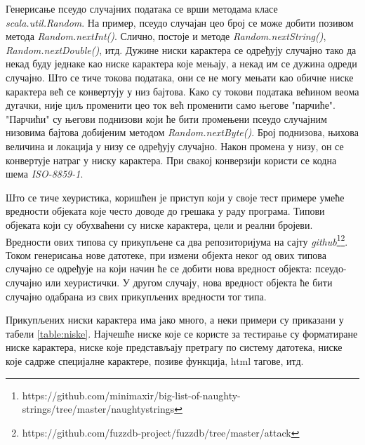 \documentclass[12pt,oneside]{memoir}
\begin{document}
Генерисање псеудо случајних података се врши методама класе \textit{scala.util.Random}. На пример, псеудо случајан цео број се може добити позивом метода \textit{Random.nextInt()}. Слично, постоје и методе \textit{Random.nextString()}, \textit{Random.nextDouble()}, итд. Дужине ниски карактера се одређују случајно тако да некад буду једнаке као ниске карактера које мењају, а некад им се дужина одреди случајно. Што се тиче токова података, они се не могу мењати као обичне ниске карактера већ се конвертују у низ бајтова. Како су токови података већином веома дугачки, није циљ променити цео ток већ променити само његове "парчиће". "Парчићи" су његови поднизови који ће бити промењени псеудо случајним низовима бајтова добијеним методом \textit{Random.nextByte()}. Број поднизова, њихова величина и локација у низу се одређују случајно. Након промена у низу, он се конвертује натраг у ниску карактера. При свакој конверзији користи се кодна шема \textit{ISO-8859-1}. 

Што се тиче хеуристика, коришћен је приступ који у своје тест примере умеће вредности објеката које често доводе до грешака у раду програма. Типови објеката који су обухваћени су ниске карактера, цели и реални бројеви. Вредности ових типова су прикупљене са два репозиторијума на сајту \textit{github}\footnote{https://github.com/minimaxir/big-list-of-naughty-strings/tree/master/naughtystrings}\footnote{https://github.com/fuzzdb-project/fuzzdb/tree/master/attack}. Током генерисања нове датотеке, при измени објекта неког од ових типова случајно се одређује на који начин ће се добити нова вредност објекта: псеудо-случајно или хеуристички. У другом случају, нова вредност објекта ће бити случајно одабрана из свих прикупљених вредности тог типа.

Прикупљених ниски карактера има јако много, а неки примери су приказани у табели \ref{table:niske}. Најчешће ниске које се користе за тестирање су форматиране ниске карактера, ниске које представљају претрагу по систему датотека, ниске које садрже специјалне карактере, позиве функција, html тагове, итд. 
\end{document}
